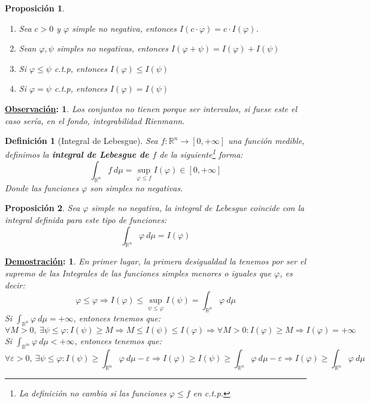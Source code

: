 \documentclass[10pt,a4paper,openright]{book}
\theoremstyle{break}
\newtheorem*{defi}{Definición}
\newtheorem*{prop}{Proposición}
\newtheorem*{demo}{\underline{Demostración}:}
\newtheorem*{obs}{\underline{Observación}:}
\begin{document}
\begin{prop}
\begin{enumerate}
    \item Sea $c > 0$ y $\varphi$ simple no negativa, entonces $I\left(c\cdot \varphi\right) = c\cdot I\left(\varphi\right)$.
    \item Sean $\varphi, \psi$ simples no negativas, entonces $I\left(\varphi + \psi\right) = I\left(\varphi\right) + I\left(\psi\right)$
    \item Si $\varphi \le \psi$ c.t.p, entonces $I\left(\varphi\right) \le I\left(\psi\right)$
    \item Si $\varphi = \psi$ c.t.p, entonces $I\left(\varphi\right) = I\left(\psi\right)$
\end{enumerate}
\end{prop}
\begin{obs}
Los conjuntos no tienen porque ser intervalos, si fuese este el caso sería, en el fondo, integrabilidad Rienmann.
\end{obs}

\begin{defi}[Integral de Lebesgue]
Sea $f: \mathbb{R}^n \rightarrow \left[0, +\infty\right]$ una función medible, definimos la \textbf{integral de Lebesgue de $f$} de la siguiente\footnote{La definición no cambia si las funciones $\varphi \leq f$ en c.t.p.} forma:
$$\int_{\mathbb{R}^n}f \ d\mu = \sup_{\varphi \leq f} I\left(\varphi\right) \in \left[0, +\infty\right]$$
Donde las funciones $\varphi$ son simples no negativas.
\end{defi}

\begin{prop}
Sea $\varphi$ simple no negativa, la integral de Lebesgue coincide con la integral definida para este tipo de funciones:
$$\int_{\mathbb{R}^n}\varphi \ d \mu = I\left(\varphi\right)$$
\end{prop}
\begin{demo}
En primer lugar, la primera desigualdad la tenemos por ser el supremo de las Integrales de las funciones simples menores o iguales que $\varphi$, es decir:
$$\varphi \le \varphi \Rightarrow I\left(\varphi\right) \leq \sup_{\psi \leq \varphi} I(\psi) = \int_{\mathbb{R}^n} \varphi \ d \mu $$
Si $\int_{\mathbb{R}^n} \varphi \ d \mu = +\infty$, entonces tenemos que:
$$\forall M > 0,\ \exists \psi \le \varphi: I\left(\psi\right) \ge M \Rightarrow M \le I\left(\psi\right) \le I\left(\varphi\right) \Rightarrow \forall M > 0: I\left(\varphi\right) \ge M \Rightarrow I\left(\varphi\right) = +\infty$$
Si $\int_{\mathbb{R}^m}\varphi \ d \mu < +\infty$, entonces tenemos que:
$$\forall \varepsilon > 0,\ \exists \psi \le \varphi: I\left(\psi\right) \ge \int_{\mathbb{R}^n}\varphi \ d \mu - \varepsilon \Rightarrow I\left(\varphi\right) \ge I(\psi) \geq  \int_{\mathbb{R}^n}\varphi \ d \mu - \varepsilon \Rightarrow I\left(\varphi\right) \ge \int_{\mathbb{R}^n}\varphi \ d \mu$$
\end{demo}
\end{document}
